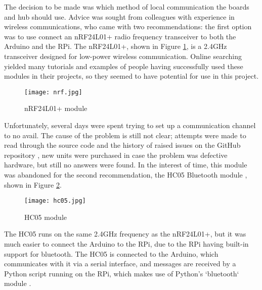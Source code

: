 The decision to be made was which method of local communication the boards and hub should use. Advice was sought from colleagues with experience in wireless communications, who came with two recommendations: the first option was to use connect an nRF24L01+ radio frequency transceiver \cite{nrf24l01:online} to both the Arduino and the RPi. The nRF24L01+, shown in Figure \ref{fig:nrf}, is a 2.4GHz transceiver designed for low-power wireless communication. Online searching yielded many tutorials and examples of people having successfully used these modules in their projects, so they seemed to have potential for use in this project.\\

\begin{figure}[H]
	\begin{center}
	\texttt{[image: nrf.jpg]}\\ 
  	\caption{nRF24L01+ module \cite{nrfjpg1082:online}}
    \label{fig:nrf}
    \end{center}
\end{figure}


Unfortunately, several days were spent trying to set up a communication channel to no avail. The cause of the problem is still not clear; attempts were made to read through the source code and the history of raised issues on the GitHub repository \cite{nRF24RF261:online}, new units were purchased in case the problem was defective hardware, but still no answers were found. In the interest of time, this module was abandoned for the second recommendation, the HC05 Bluetooth module \cite{istd016A58:online}, shown in Figure \ref{fig:hc05}. \\

\begin{figure}[H]
	\begin{center}
	\texttt{[image: hc05.jpg]}\\ 
  	\caption{HC05 module \cite{1438017179:online}}
    \label{fig:hc05}
    \end{center}
\end{figure}

The HC05 runs on the same 2.4GHz frequency as the nRF24L01+, but it was much easier to connect the Arduino to the RPi, due to the RPi having built-in support for bluetooth. The HC05 is connected to the Arduino, which communicates with it via a serial interface, and messages are received by a Python script running on the RPi, which makes use of Python's `bluetooth` module \cite{karulisp38:online}. \\


